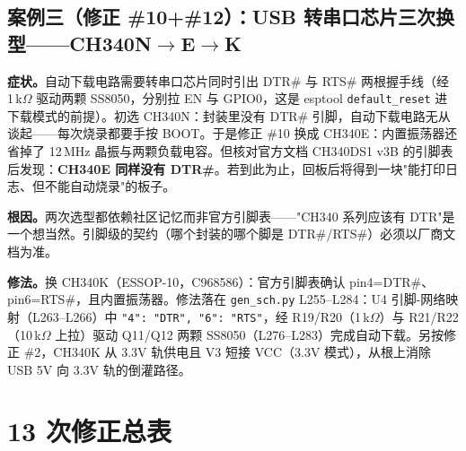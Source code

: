 \subsection{案例三（修正 \#10+\#12）：USB 转串口芯片三次换型——CH340N$\to$E$\to$K}
\label{sec:sch-case12}

\textbf{症状。}自动下载电路需要转串口芯片同时引出 DTR\# 与 RTS\# 两根握手线（经 1\,k$\Omega$ 驱动两颗 SS8050，分别拉 EN 与 GPIO0，这是 esptool \texttt{default\_reset} 进下载模式的前提）。初选 CH340N：封装里没有 DTR\# 引脚，自动下载电路无从谈起——每次烧录都要手按 BOOT。于是修正 \#10 换成 CH340E：内置振荡器还省掉了 12\,MHz 晶振与两颗负载电容。但核对官方文档 CH340DS1 v3B 的引脚表后发现：\textbf{CH340E 同样没有 DTR\#}。若到此为止，回板后将得到一块"能打印日志、但不能自动烧录"的板子。

\textbf{根因。}两次选型都依赖社区记忆而非官方引脚表——"CH340 系列应该有 DTR"是一个想当然。引脚级的契约（哪个封装的哪个脚是 DTR\#/RTS\#）必须以厂商文档为准。

\textbf{修法。}换 CH340K（ESSOP-10，C968586）：官方引脚表确认 pin4=DTR\#、pin6=RTS\#，且内置振荡器。修法落在 \texttt{gen\_sch.py} L255--L284：U4 引脚-网络映射（L263--L266）中 \texttt{"4": "DTR", "6": "RTS"}，经 R19/R20（1\,k$\Omega$）与 R21/R22（10\,k$\Omega$ 上拉）驱动 Q11/Q12 两颗 SS8050（L276--L283）完成自动下载。另按修正 \#2，CH340K 从 3.3V 轨供电且 V3 短接 VCC（3.3V 模式），从根上消除 USB 5V 向 3.3V 轨的倒灌路径。

\section{13 次修正总表}
\label{sec:sch-fixlog}

